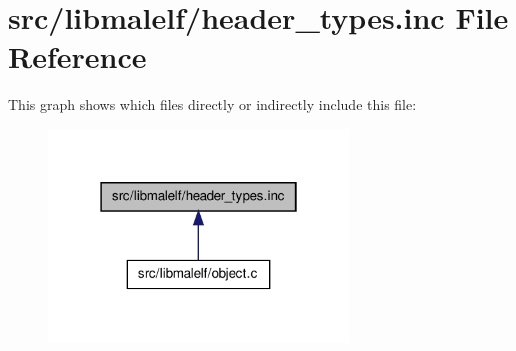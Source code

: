 \hypertarget{header__types_8inc}{
\section{src/libmalelf/header\_\-types.inc File Reference}
\label{header__types_8inc}
}
This graph shows which files directly or indirectly include this file:\nopagebreak
\begin{figure}[H]
\begin{center}
\leavevmode
\includegraphics[width=226pt]{header__types_8inc__dep__incl}
\end{center}
\end{figure}
